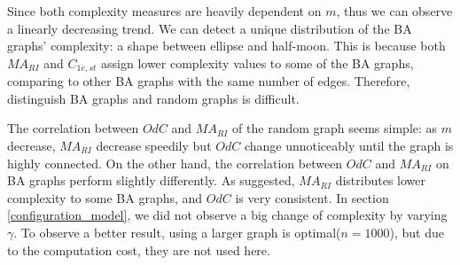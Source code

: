 \documentclass[12pt]{article}
\begin{document}
Since both complexity measures are heavily dependent on $m$, thus we can observe a linearly decreasing trend. We can detect a unique distribution of the BA graphs' complexity: a shape between ellipse and half-moon. This is because both $MA_{RI}$ and $C_{1e,st}$ assign lower complexity values to some of the BA graphs, comparing to other BA graphs with the same number of edges. Therefore, distinguish BA graphs and random graphs is difficult.\par
The correlation between $OdC$ and $MA_{RI}$ of the random graph seems simple: as $m$ decrease, $MA_{RI}$ decrease speedily but $OdC$ change unnoticeably until the graph is highly connected. On the other hand, the correlation between $OdC$ and $MA_{RI}$ on BA graphs perform slightly differently. As suggested, $MA_{RI}$ distributes lower complexity to some BA graphs, and $OdC$ is very consistent. In section \ref{configuration_model}, we did not observe a big change of complexity by varying $\gamma$. To observe a better result, using a larger graph is optimal($n=1000$), but due to the computation cost, they are not used here.
\end{document}
